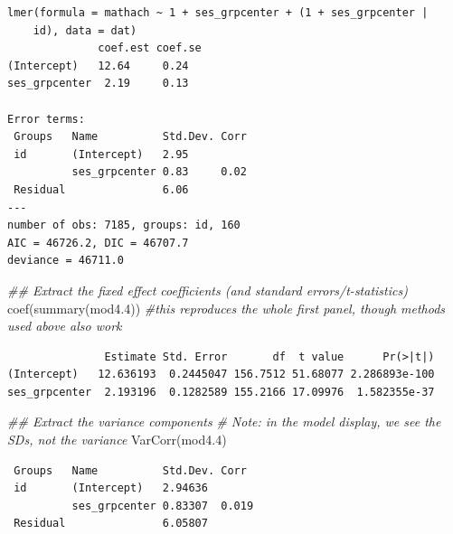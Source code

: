 \documentclass[
  letterpaper,
  DIV=11,
  numbers=noendperiod]{scrreprt}
\newenvironment{Shaded}{\begin{snugshade}}{\end{snugshade}}
\newcommand{\CommentTok}[1]{\textcolor[rgb]{0.38,0.63,0.69}{\textit{#1}}}
\newcommand{\DecValTok}[1]{\textcolor[rgb]{0.25,0.63,0.44}{#1}}
\newcommand{\DocumentationTok}[1]{\textcolor[rgb]{0.73,0.13,0.13}{\textit{#1}}}
\newcommand{\FloatTok}[1]{\textcolor[rgb]{0.25,0.63,0.44}{#1}}
\newcommand{\FunctionTok}[1]{\textcolor[rgb]{0.02,0.16,0.49}{#1}}
\newcommand{\NormalTok}[1]{\textcolor[rgb]{0.00,0.44,0.13}{#1}}
\newcommand{\SpecialCharTok}[1]{\textcolor[rgb]{0.25,0.44,0.63}{#1}}
\begin{document}
\begin{verbatim}
lmer(formula = mathach ~ 1 + ses_grpcenter + (1 + ses_grpcenter | 
    id), data = dat)
              coef.est coef.se
(Intercept)   12.64     0.24  
ses_grpcenter  2.19     0.13  

Error terms:
 Groups   Name          Std.Dev. Corr 
 id       (Intercept)   2.95          
          ses_grpcenter 0.83     0.02 
 Residual               6.06          
---
number of obs: 7185, groups: id, 160
AIC = 46726.2, DIC = 46707.7
deviance = 46711.0 
\end{verbatim}

\begin{Shaded}
\begin{Highlighting}[]
\DocumentationTok{\#\# Extract the fixed effect coefficients (and standard errors/t{-}statistics)}
\FunctionTok{coef}\NormalTok{(}\FunctionTok{summary}\NormalTok{(mod4}\FloatTok{.4}\NormalTok{)) }\CommentTok{\#this reproduces the whole first panel, though methods used above also work}
\end{Highlighting}
\end{Shaded}

\begin{verbatim}
               Estimate Std. Error       df  t value      Pr(>|t|)
(Intercept)   12.636193  0.2445047 156.7512 51.68077 2.286893e-100
ses_grpcenter  2.193196  0.1282589 155.2166 17.09976  1.582355e-37
\end{verbatim}

\begin{Shaded}
\begin{Highlighting}[]
\DocumentationTok{\#\# Extract the variance components}
\CommentTok{\# Note: in the model display, we see the SDs, not the variance}
\FunctionTok{VarCorr}\NormalTok{(mod4}\FloatTok{.4}\NormalTok{) }
\end{Highlighting}
\end{Shaded}

\begin{verbatim}
 Groups   Name          Std.Dev. Corr 
 id       (Intercept)   2.94636       
          ses_grpcenter 0.83307  0.019
 Residual               6.05807       
\end{verbatim}

\begin{Shaded}
\end{Shaded}
\end{document}
